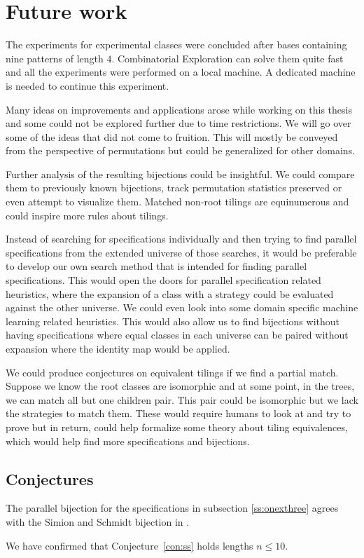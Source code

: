 \label{ch:conclusion}

\section{Future work}\label{s:fw}
The experiments for experimental classes were concluded after bases containing nine patterns of length $4$. Combinatorial Exploration can solve them quite fast and all the experiments were performed on a local machine. A dedicated machine is needed to continue this experiment.

Many ideas on improvements and applications arose while working on this thesis and some could not be explored further due to time restrictions. We will go over some of the ideas that did not come to fruition. This will mostly be conveyed from the perspective of permutations but could be generalized for other domains.

Further analysis of the resulting bijections could be insightful. We could compare them to previously known bijections, track permutation statistics preserved or even attempt to visualize them. Matched non-root tilings are equinumerous and could inspire more rules about tilings.

Instead of searching for specifications individually and then trying to find parallel specifications from the extended universe of those searches, it would be preferable to develop our own search method that is intended for finding parallel specifications. This would open the doors for parallel specification related heuristics, where the expansion of a class with a strategy could be evaluated against the other universe. We could even look into some domain specific machine learning related heuristics. This would also allow us to find bijections without having specifications where equal classes in each universe can be paired without expansion where the identity map would be applied.

We could produce conjectures on equivalent tilings if we find a partial match. Suppose we know the root classes are isomorphic and at some point, in the trees, we can match all but one children pair. This pair could be isomorphic but we lack the strategies to match them. These would require humans to look at and try to prove but in return, could help formalize some theory about tiling equivalences, which would help find more specifications and bijections.

\subsection{Conjectures}
\begin{conjecture}\label{con:ss}
The parallel bijection for the specifications in subsection \ref{ss:onexthree} agrees with the Simion and Schmidt bijection in \cite{simionandschmidt}.
\end{conjecture}
We have confirmed that Conjecture~\ref{con:ss} holds lengths $n \leq 10$.



